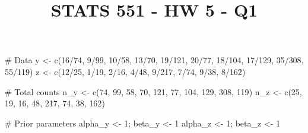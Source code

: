 \documentclass[
  10pt,
]{article}
\title{STATS 551 - HW 5 - Q1}
\author{}
\date{}
\newenvironment{Shaded}{\begin{snugshade}}{\end{snugshade}}
\newcommand{\CommentTok}[1]{\textcolor[rgb]{0.37,0.37,0.37}{#1}}
\newcommand{\DecValTok}[1]{\textcolor[rgb]{0.68,0.00,0.00}{#1}}
\newcommand{\FunctionTok}[1]{\textcolor[rgb]{0.28,0.35,0.67}{#1}}
\newcommand{\NormalTok}[1]{\textcolor[rgb]{0.00,0.23,0.31}{#1}}
\newcommand{\OtherTok}[1]{\textcolor[rgb]{0.00,0.23,0.31}{#1}}
\newcommand{\SpecialCharTok}[1]{\textcolor[rgb]{0.37,0.37,0.37}{#1}}
\begin{document}
\maketitle


\begin{Shaded}
\begin{Highlighting}[]
\CommentTok{\# Data}
\NormalTok{y }\OtherTok{\textless{}{-}} \FunctionTok{c}\NormalTok{(}\DecValTok{16}\SpecialCharTok{/}\DecValTok{74}\NormalTok{, }\DecValTok{9}\SpecialCharTok{/}\DecValTok{99}\NormalTok{, }\DecValTok{10}\SpecialCharTok{/}\DecValTok{58}\NormalTok{, }\DecValTok{13}\SpecialCharTok{/}\DecValTok{70}\NormalTok{, }\DecValTok{19}\SpecialCharTok{/}\DecValTok{121}\NormalTok{, }\DecValTok{20}\SpecialCharTok{/}\DecValTok{77}\NormalTok{, }\DecValTok{18}\SpecialCharTok{/}\DecValTok{104}\NormalTok{, }\DecValTok{17}\SpecialCharTok{/}\DecValTok{129}\NormalTok{, }\DecValTok{35}\SpecialCharTok{/}\DecValTok{308}\NormalTok{, }\DecValTok{55}\SpecialCharTok{/}\DecValTok{119}\NormalTok{)}
\NormalTok{z }\OtherTok{\textless{}{-}} \FunctionTok{c}\NormalTok{(}\DecValTok{12}\SpecialCharTok{/}\DecValTok{25}\NormalTok{, }\DecValTok{1}\SpecialCharTok{/}\DecValTok{19}\NormalTok{, }\DecValTok{2}\SpecialCharTok{/}\DecValTok{16}\NormalTok{, }\DecValTok{4}\SpecialCharTok{/}\DecValTok{48}\NormalTok{, }\DecValTok{9}\SpecialCharTok{/}\DecValTok{217}\NormalTok{, }\DecValTok{7}\SpecialCharTok{/}\DecValTok{74}\NormalTok{, }\DecValTok{9}\SpecialCharTok{/}\DecValTok{38}\NormalTok{, }\DecValTok{8}\SpecialCharTok{/}\DecValTok{162}\NormalTok{)}

\CommentTok{\# Total counts}
\NormalTok{n\_y }\OtherTok{\textless{}{-}} \FunctionTok{c}\NormalTok{(}\DecValTok{74}\NormalTok{, }\DecValTok{99}\NormalTok{, }\DecValTok{58}\NormalTok{, }\DecValTok{70}\NormalTok{, }\DecValTok{121}\NormalTok{, }\DecValTok{77}\NormalTok{, }\DecValTok{104}\NormalTok{, }\DecValTok{129}\NormalTok{, }\DecValTok{308}\NormalTok{, }\DecValTok{119}\NormalTok{)}
\NormalTok{n\_z }\OtherTok{\textless{}{-}} \FunctionTok{c}\NormalTok{(}\DecValTok{25}\NormalTok{, }\DecValTok{19}\NormalTok{, }\DecValTok{16}\NormalTok{, }\DecValTok{48}\NormalTok{, }\DecValTok{217}\NormalTok{, }\DecValTok{74}\NormalTok{, }\DecValTok{38}\NormalTok{, }\DecValTok{162}\NormalTok{)}

\CommentTok{\# Prior parameters}
\NormalTok{alpha\_y }\OtherTok{\textless{}{-}} \DecValTok{1}\NormalTok{; beta\_y }\OtherTok{\textless{}{-}} \DecValTok{1}
\NormalTok{alpha\_z }\OtherTok{\textless{}{-}} \DecValTok{1}\NormalTok{; beta\_z }\OtherTok{\textless{}{-}} \DecValTok{1}


\end{Highlighting}
\end{Shaded}
\end{document}

